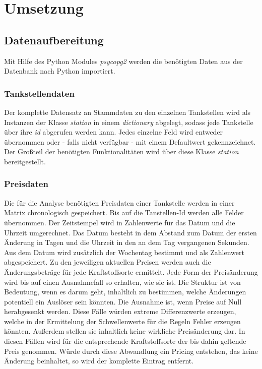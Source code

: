 \chapter{Umsetzung}
\label{sec:Umsetzung}

\section{Datenaufbereitung}
Mit Hilfe des Python Modules \textit{psycopg2} werden die benötigten Daten aus der Datenbank nach Python importiert. 

\subsection{Tankstellendaten}
Der komplette Datensatz an Stammdaten zu den einzelnen Tankstellen wird als Instanzen der Klasse \textit{station} in einem \textit{dictionary} abgelegt, sodass jede Tankstelle über ihre \textit{id} abgerufen werden kann. Jedes einzelne Feld wird entweder übernommen oder - falls nicht verfügbar - mit einem Defaultwert gekennzeichnet. Der Großteil der benötigten Funktionalitäten wird über diese Klasse \textit{station} bereitgestellt.  

\subsection{Preisdaten}
Die für die Analyse benötigten Preisdaten einer Tankstelle werden in einer Matrix chronologisch gespeichert. Bis auf die Tanstellen-Id werden alle Felder übernommen. Der Zeitstempel wird in Zahlenwerte für das Datum und die Uhrzeit umgerechnet. Das Datum besteht in dem Abstand zum Datum der ersten Änderung in Tagen und die Uhrzeit in den an dem Tag vergangenen Sekunden. Aus dem Datum wird zusätzlich der Wochentag bestimmt und als Zahlenwert abgespeichert. Zu den jeweiligen aktuellen Preisen werden auch die Änderungsbeträge für jede Kraftstoffsorte ermittelt. Jede Form der Preisänderung wird bis auf einen Ausnahmefall so erhalten, wie sie ist. Die Struktur ist von Bedeutung, wenn es darum geht, inhaltlich zu bestimmen, welche Änderungen potentiell ein Auslöser sein könnten. Die Ausnahme ist, wenn Preise auf Null herabgesenkt werden. Diese Fälle würden extreme Differenzwerte erzeugen, welche in der Ermittelung der Schwellenwerte für die Regeln Fehler erzeugen könnten. Außerdem stellen sie inhaltlich keine wirkliche Preisänderung dar. In diesen Fällen wird für die entsprechende Kraftstoffsorte der bis dahin geltende Preis genommen. Würde durch diese Abwandlung ein Pricing entstehen, das keine Änderung beinhaltet, so wird der komplette Eintrag entfernt.

